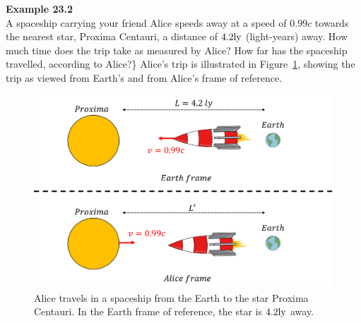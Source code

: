 \begin{framed}
\textbf{Example 23.2}\\
A spaceship carrying your friend Alice speeds away at a speed of $0.99c$ towards the nearest star, Proxima Centauri, a distance of $4.2 {\rm ly}$ (light-years) away. How much time does the trip take as measured by Alice? How far has the spaceship travelled, according to Alice?\}
Alice's trip is illustrated in Figure~\ref{fig:specialrelativity:alphatrip}, showing the trip as viewed from Earth's and from Alice's frame of reference.

\begin{figure}[!htbp]
\centering
\includegraphics[width=0.8\linewidth]{files/alphatrip-3ea02d44948e5bb04a3cc62ada80ac9a.png}
\caption[]{Alice travels in a spaceship from the Earth to the star Proxima Centauri. In the Earth frame of reference, the star is $4.2 {\rm ly}$ away.}
\label{fig:specialrelativity:alphatrip}
\end{figure}


\end{framed}
